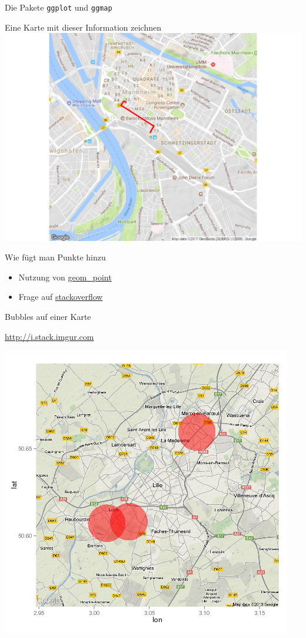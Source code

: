 \documentclass[ignorenonframetext,]{beamer}
\begin{document}
\begin{frame}[fragile]{Die Pakete \texttt{ggplot} und \texttt{ggmap}}
\begin{block}{Eine Karte mit dieser Information zeichnen}
\includegraphics{R_intern_files/figure-beamer/unnamed-chunk-285-1.pdf}

Wie fügt man Punkte hinzu

\begin{itemize}
\item
  Nutzung von
  \href{http://zevross.com/blog/2014/07/16/mapping-in-r-using-the-ggplot2-package/}{geom\_point}
\item
  Frage auf
  \href{http://stackoverflow.com/questions/15069963/getting-a-map-with-points-using-ggmap-and-ggplot2}{stackoverflow}
\end{itemize}

\end{block}

\begin{block}{Bubbles auf einer Karte}

\url{http://i.stack.imgur.com}

\includegraphics{./tex2pdf.9796/5a5e1e1264b3f174f2e8d2c9935aced7b6988469.png}


\end{block}
\end{frame}
\end{document}
